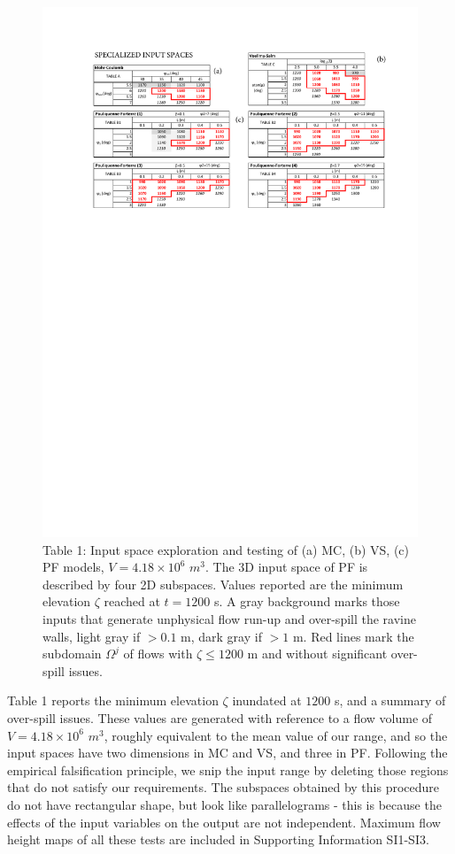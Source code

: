 \documentclass[nhess, manuscript]{copernicus}
\begin{document}
\begin{figure}[H]
\centering
\includegraphics[width=1\textwidth]{Table1.pdf}
\caption*{Table 1: Input space exploration and testing of (a) MC, (b) VS, (c) PF models, $V=4.18\times 10^6$ $m^3$. The 3D input space of PF is described by four 2D subspaces. Values reported are the minimum elevation $\zeta$ reached at $t=1200$ s. A gray background marks those inputs that generate unphysical flow run-up and over-spill the ravine walls, light gray if $>0.1$ m, dark gray if $>1$ m. Red lines mark the subdomain $\Omega^j$ of flows with $\zeta\le1200$ m and without significant over-spill issues.}
\end{figure}

Table 1 reports the minimum elevation $\zeta$ inundated at $1200$ s, and a summary of over-spill issues. These values are generated with reference to a flow volume of $V=4.18\times 10^6$ $m^3$, roughly equivalent to the mean value of our range, and so the input spaces have two dimensions in MC and VS, and three in PF. Following the empirical falsification principle, we snip the input range by  deleting those regions that do not satisfy our requirements. The  subspaces obtained by this procedure do not have rectangular shape, but look like parallelograms - this is because the effects of the input variables on the output are not independent. Maximum flow height maps of all these tests are included in Supporting Information SI1-SI3.
\end{document}
